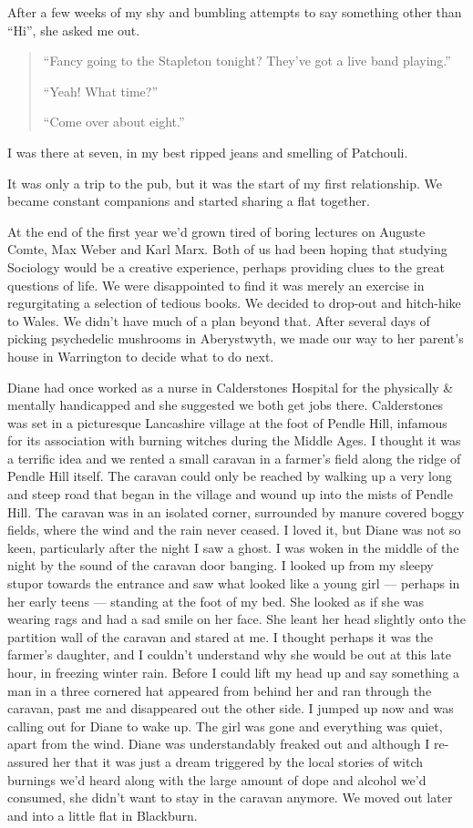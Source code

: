 \documentclass[12pt]{memoir}
\begin{document}
After a few weeks of my shy and bumbling attempts
to say something other than “Hi”, she asked me out.

\begin{quote}
“Fancy going to the Stapleton tonight? They’ve got a live band playing.”

“Yeah! What time?”

“Come over about eight.”
\end{quote}

I was there at seven, in my best ripped jeans and smelling of Patchouli.

It was only a trip to the pub, but it was the start of my first relationship.
We became constant companions and started sharing a flat together.

At the end of the first year we’d grown tired of boring lectures
on Auguste Comte, Max Weber and Karl Marx.
Both of us had been hoping that studying Sociology
would be a creative experience,
perhaps providing clues to the great questions of life.
We were disappointed to find it was merely an exercise
in regurgitating a selection of tedious books.
We decided to drop-out and hitch-hike to Wales.
We didn’t have much of a plan beyond that.
After several days of picking psychedelic mushrooms in Aberystwyth,
we made our way to her parent’s house in Warrington to decide what to do next.

Diane had once worked as a nurse in Calderstones Hospital
for the physically \& mentally handicapped
and she suggested we both get jobs there.
Calderstones was set in a picturesque Lancashire village at the foot of
Pendle Hill, infamous for its association
with burning witches during the Middle Ages.
I thought it was a terrific idea and we rented a small caravan
in a farmer’s field along the ridge of Pendle Hill itself.
The caravan could only be reached by walking up a very long and steep road
that began in the village and wound up into the mists of Pendle Hill.
The caravan was in an isolated corner,
surrounded by manure covered boggy fields,
where the wind and the rain never ceased.
I loved it, but Diane was not so keen,
particularly after the night I saw a ghost.
I was woken in the middle of the night
by the sound of the caravan door banging.
I looked up from my sleepy stupor towards the entrance
and saw what looked like a young girl — perhaps in her early teens —
standing at the foot of my bed.
She looked as if she was wearing rags and had a sad smile on her face.
She leant her head slightly onto the partition wall of the caravan
and stared at me.
I thought perhaps it was the farmer’s daughter,
and I couldn’t understand why she would be out at this late hour,
in freezing winter rain.
Before I could lift my head up and say something a man in a three cornered hat
appeared from behind her and ran through the caravan,
past me and disappeared out the other side.
I jumped up now and was calling out for Diane to wake up.
The girl was gone and everything was quiet, apart from the wind.
Diane was understandably freaked out and although I re-assured her
that it was just a dream triggered by the local stories of witch burnings
we’d heard along with the large amount of dope and alcohol we’d consumed,
she didn’t want to stay in the caravan anymore.
We moved out later and into a little flat in Blackburn.
\end{document}
